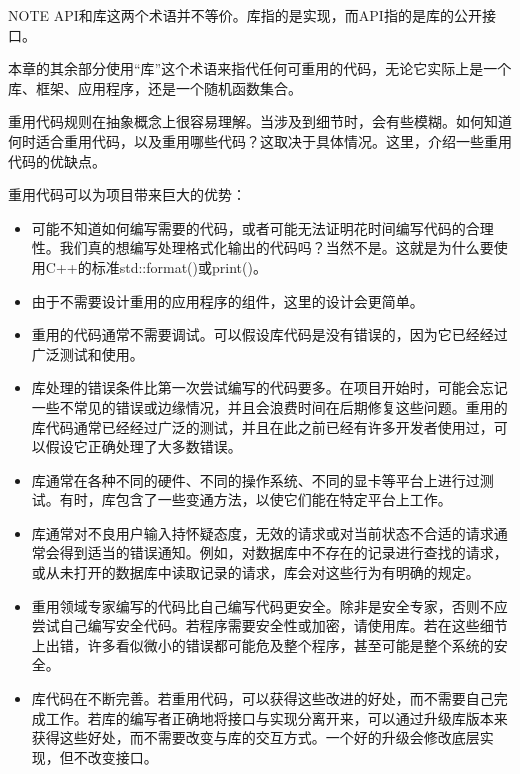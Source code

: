 \begin{myNotic}{NOTE}
API和库这两个术语并不等价。库指的是实现，而API指的是库的公开接口。
\end{myNotic}

本章的其余部分使用“库”这个术语来指代任何可重用的代码，无论它实际上是一个库、框架、应用程序，还是一个随机函数集合。


重用代码规则在抽象概念上很容易理解。当涉及到细节时，会有些模糊。如何知道何时适合重用代码，以及重用哪些代码？这取决于具体情况。这里，介绍一些重用代码的优缺点。


重用代码可以为项目带来巨大的优势：

\begin{itemize}
\item
可能不知道如何编写需要的代码，或者可能无法证明花时间编写代码的合理性。我们真的想编写处理格式化输出的代码吗？当然不是。这就是为什么要使用C++的标准std::format()或print()。

\item
由于不需要设计重用的应用程序的组件，这里的设计会更简单。

\item
重用的代码通常不需要调试。可以假设库代码是没有错误的，因为它已经经过广泛测试和使用。

\item
库处理的错误条件比第一次尝试编写的代码要多。在项目开始时，可能会忘记一些不常见的错误或边缘情况，并且会浪费时间在后期修复这些问题。重用的库代码通常已经经过广泛的测试，并且在此之前已经有许多开发者使用过，可以假设它正确处理了大多数错误。

\item
库通常在各种不同的硬件、不同的操作系统、不同的显卡等平台上进行过测试。有时，库包含了一些变通方法，以使它们能在特定平台上工作。

\item
库通常对不良用户输入持怀疑态度，无效的请求或对当前状态不合适的请求通常会得到适当的错误通知。例如，对数据库中不存在的记录进行查找的请求，或从未打开的数据库中读取记录的请求，库会对这些行为有明确的规定。

\item
重用领域专家编写的代码比自己编写代码更安全。除非是安全专家，否则不应尝试自己编写安全代码。若程序需要安全性或加密，请使用库。若在这些细节上出错，许多看似微小的错误都可能危及整个程序，甚至可能是整个系统的安全。

\item
库代码在不断完善。若重用代码，可以获得这些改进的好处，而不需要自己完成工作。若库的编写者正确地将接口与实现分离开来，可以通过升级库版本来获得这些好处，而不需要改变与库的交互方式。一个好的升级会修改底层实现，但不改变接口。
\end{itemize}

